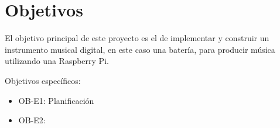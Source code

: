
\chapter{Objetivos} %
\label{cha:Objetivos}

    El objetivo principal de este proyecto es el de implementar y construir un instrumento musical digital, en este caso
    una batería, para producir música utilizando una Raspberry Pi.

    Objetivos específicos:
    \begin{itemize}
        \item OB-E1: Planificación
        \item OB-E2:
    \end{itemize}

